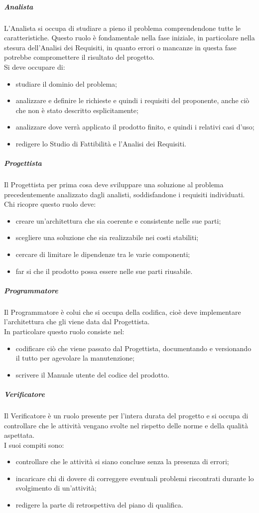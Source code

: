 \subparagraph{Analista}
L'Analista si occupa di studiare a pieno il problema comprendendone tutte le caratteristiche. Questo ruolo è fondamentale nella fase iniziale, in particolare nella stesura dell'Analisi dei Requisiti, in quanto errori o mancanze in questa fase potrebbe compromettere il risultato del progetto.\\
Si deve occupare di:
\begin{itemize}
    \item studiare il dominio del problema;
    \item analizzare e definire le richieste e quindi i requisiti del proponente, anche ciò che non è stato descritto esplicitamente;
    \item analizzare dove verrà applicato il prodotto finito, e quindi i relativi casi d'uso;
    \item redigere lo Studio di Fattibilità e l'Analisi dei Requisiti.
\end{itemize}

\subparagraph{Progettista}
Il Progettista per prima cosa deve sviluppare una soluzione al problema precedentemente analizzato dagli analisti, soddisfandone i requisiti individuati.\\
Chi ricopre questo ruolo deve:
\begin{itemize}
    \item creare un'architettura che sia coerente e consistente nelle sue parti;
    \item scegliere una soluzione che sia realizzabile nei costi stabiliti;
    \item cercare di limitare le dipendenze tra le varie componenti;
    \item far si che il prodotto possa essere nelle sue parti riusabile.
\end{itemize}

\subparagraph{Programmatore}
Il Programmatore è colui che si occupa della codifica, cioè deve implementare l'architettura che gli viene data dal Progettista.\\
In particolare questo ruolo consiste nel:
\begin{itemize}
    \item codificare ciò che viene passato dal Progettista, documentando e versionando il tutto per agevolare la manutenzione;
    \item scrivere il Manuale utente del codice del prodotto.
\end{itemize}

\subparagraph{Verificatore}
Il Verificatore è un ruolo presente per l'intera durata del progetto e si occupa di controllare che le attività vengano svolte nel rispetto delle norme e della qualità aspettata.\\
I suoi compiti sono:
\begin{itemize}
    \item controllare che le attività si siano concluse senza la presenza di errori;
    \item incaricare chi di dovere di correggere eventuali problemi riscontrati durante lo svolgimento di un'attività;
    \item redigere la parte di retrospettiva del piano di qualifica.
\end{itemize}

